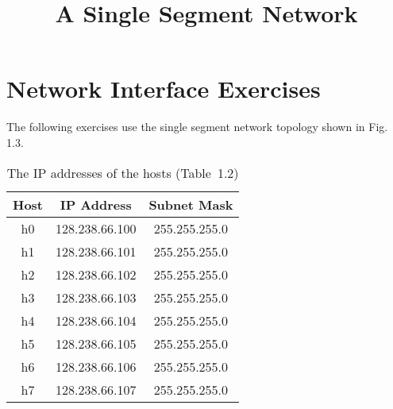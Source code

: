\documentclass{../UTNetLab}
\title{A Single Segment Network}
\begin{document}
\part{Network Interface Exercises}
    The following exercises use the single segment network topology shown in Fig. 1.3.
    \begin{center}
        \begin{minipage}{0.48\textwidth}
            \begin{flushleft}
                \begin{table}[H]
                    \caption{The IP addresses of the hosts (Table~1.2)}
                    \centering
                    \begin{tabular}{ c c c }
                        \hline \hline
                        Host & IP Address & Subnet Mask \\
                        \hline 
                        h0 & 128.238.66.100 & 255.255.255.0 \\
                        h1 & 128.238.66.101 & 255.255.255.0 \\
                        h2 & 128.238.66.102 & 255.255.255.0 \\
                        h3 & 128.238.66.103 & 255.255.255.0 \\
                        h4 & 128.238.66.104 & 255.255.255.0 \\
                        h5 & 128.238.66.105 & 255.255.255.0 \\
                        h6 & 128.238.66.106 & 255.255.255.0 \\
                        h7 & 128.238.66.107 & 255.255.255.0 \\
                        \hline \hline
                        \end{tabular}
                \end{table}
            \end{flushleft}
        \end{minipage}
        \begin{minipage}{0.48\textwidth}
            \begin{flushright}
                \begin{figure}[H]
                    \centering
\end{figure}
\end{flushright}
\end{minipage}
\end{center}
\end{document}
